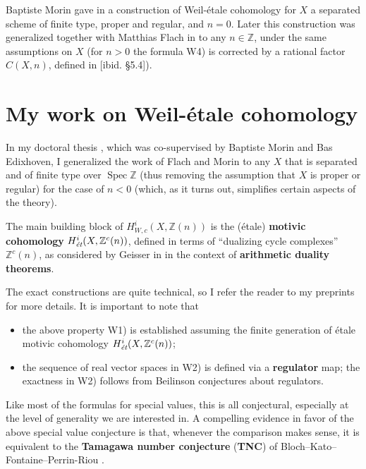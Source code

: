 \documentclass{article}
\DeclareMathOperator{\Spec}{Spec}
\newcommand{\ZZ}{\mathbb{Z}}
\begin{document}
Baptiste Morin gave in \cite{Morin-2014} a construction of Weil-étale cohomology
for $X$ a separated scheme of finite type, proper and regular, and $n =
0$. Later this construction was generalized together with Matthias Flach in
\cite{Flach-Morin-2018} to any $n \in \ZZ$, under the same assumptions on $X$
(for $n > 0$ the formula W4) is corrected by a rational factor $C(X,n)$, defined
in [ibid. \S 5.4]).

\section{My work on Weil-étale cohomology}

In my doctoral thesis \cite{These}, which was co-supervised by Baptiste Morin
and Bas Edixhoven, I generalized the work of Flach and Morin to any $X$ that is
separated and of finite type over $\Spec \ZZ$ (thus removing the assumption that
$X$ is proper or regular) for the case of $n < 0$ (which, as it turns out,
simplifies certain aspects of the theory).

The main building block of $H^i_{W,c} (X,\ZZ(n))$ is the (étale)
\textbf{motivic cohomology} $H^i_\text{\it ét} (X, \ZZ^c (n))$, defined in terms
of ``dualizing cycle complexes'' $\ZZ^c (n)$, as considered by Geisser in
\cite{Geisser-2010} in the context of \textbf{arithmetic duality theorems}.

The exact constructions are quite technical, so I refer the reader to my
preprints \cite{Weil-etale-cohomology,Weil-etale-zeta-values} for more
details. It is important to note that
\begin{itemize}
\item the above property W1) is established assuming the finite generation of
  étale motivic cohomology $H^i_\text{\it ét} (X, \ZZ^c (n))$;

\item the sequence of real vector spaces in W2) is defined via a
  \textbf{regulator} map; the exactness in W2) follows from Beilinson
  conjectures about regulators.
\end{itemize}


Like most of the formulas for special values, this is all conjectural,
especially at the level of generality we are interested in. A compelling
evidence in favor of the above special value conjecture is that, whenever the
comparison makes sense, it is equivalent to the \textbf{Tamagawa number
  conjecture} (\textbf{TNC}) of Bloch--Kato--Fontaine--Perrin-Riou
\cite{Fontaine-Perrin-Riou}.
\end{document}
